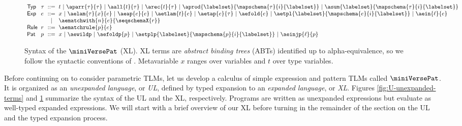 \documentclass[acmsmall,10pt,review,anonymous]{acmart}\settopmatter{printfolios=true}
\begin{document}
\begin{figure}
\begin{minipage}{\textwidth}
$\arraycolsep=3pt\begin{array}{llcl}
\mathsf{Typ} & \tau & ::= & t ~\vert~ \aparr{\tau}{\tau} ~\vert~ \aall{t}{\tau} ~\vert~ \arec{t}{\tau} ~\vert~ \aprod{\labelset}{\mapschema{\tau}{i}{\labelset}} ~\vert~ \asum{\labelset}{\mapschema{\tau}{i}{\labelset}}\\
\mathsf{Exp} & e & ::= & x ~\vert~ \aelam{\tau}{x}{e} ~\vert~ \aeap{e}{e} ~\vert~ \aetlam{t}{e} ~\vert~ \aetap{e}{\tau} ~\vert~ \aefold{e} ~\vert~ \aetpl{\labelset}{\mapschema{e}{i}{\labelset}} ~\vert~ \aein{\ell}{e} \\
& & \vert & \aematchwith{n}{e}{\seqschemaX{r}}\\
\mathsf{Rule} & r & ::= & \aematchrule{p}{e}\\
\mathsf{Pat} & p & ::= & x  ~\vert~ \aewildp ~\vert~ \aefoldp{p} ~\vert~ \aetplp{\labelset}{\mapschema{p}{i}{\labelset}} ~\vert~ \aeinjp{\ell}{p}
\end{array}$
\end{minipage}
\vspace{-10px}
\caption[Syntax of the XL of $\miniVersePat$]{Syntax of the $\miniVersePat$ (XL). XL terms are \emph{abstract binding trees} (ABTs) identified up to alpha-equivalence, so we follow the syntactic conventions of \citet{pfple1}. Metavariable $x$ ranges over variables and $t$ over type variables.  %
}
\vspace{-4px}
\label{fig:U-expanded-terms}
\end{figure}

Before continuing on to consider parametric TLMs, let us develop a calculus of simple expression and pattern TLMs called $\miniVersePat$. It is organized as an \emph{unexpanded language}, or \emph{UL}, defined by typed expansion to an \emph{expanded language}, or \emph{XL}. Figures \ref{fig:U-unexpanded-terms}  and \ref{fig:U-expanded-terms} summarize the syntax of the UL and  the XL, respectively. Programs are written as unexpanded expressions but evaluate as well-typed expanded expressions. We will start with a brief overview of our XL before turning in the remainder of the section on the UL and the typed expansion process.
\end{document}
